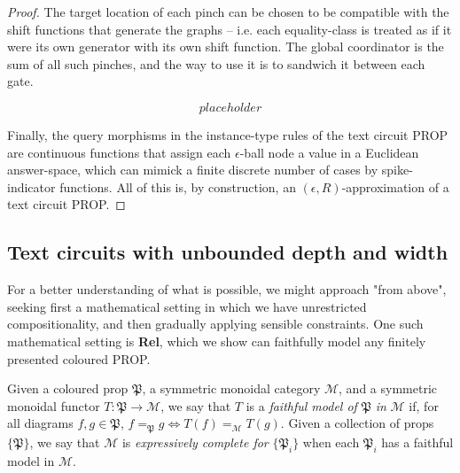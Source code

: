 \begin{fullwidth}
\begin{theorem}
\begin{proof}
The target location of each pinch can be chosen to be compatible with the shift functions that generate the graphs -- i.e. each equality-class is treated as if it were its own generator with its own shift function. The global coordinator is the sum of all such pinches, and the way to use it is to sandwich it between each gate.

\[placeholder\]

Finally, the query morphisms in the instance-type rules of the text circuit PROP are continuous functions that assign each $\epsilon$-ball node a value in a Euclidean answer-space, which can mimick a finite discrete number of cases by spike-indicator functions. All of this is, by construction, an $(\epsilon,R)$-approximation of a text circuit PROP.
\end{proof}
\end{theorem}

\subsection{Text circuits with unbounded depth and width}

For a better understanding of what is possible, we might approach "from above", seeking first a mathematical setting in which we have unrestricted compositionality, and then gradually applying sensible constraints. One such mathematical setting is \textbf{Rel}, which we show can faithfully model any finitely presented coloured PROP.

\begin{defn}
Given a coloured prop $\mathfrak{P}$, a symmetric monoidal category $\mathcal{M}$, and a symmetric monoidal functor $T: \mathfrak{P} \rightarrow \mathcal{M}$, we say that $T$ is a \emph{faithful model of} $\mathfrak{P}$ \emph{in} $\mathcal{M}$ if, for all diagrams $f,g \in \mathfrak{P}$, $f =_\mathfrak{P} g \iff T(f) =_\mathcal{M} T(g)$. Given a collection of props $\{\mathfrak{P}\}$, we say that $\mathcal{M}$ is \emph{expressively complete for} $\{\mathfrak{P}_i\}$ when each $\mathfrak{P}_i$ has a faithful model in $\mathcal{M}$.
\end{defn}


\end{fullwidth}
